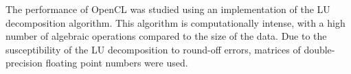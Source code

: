 \par{The performance of OpenCL was studied using an implementation of 
    the LU decomposition algorithm. This algorithm is computationally intense, 
    with a high number of algebraic operations compared to the size of the data. 
    Due to the susceptibility of the LU decomposition to round-off errors, 
    matrices of double-precision floating point numbers were used.}
